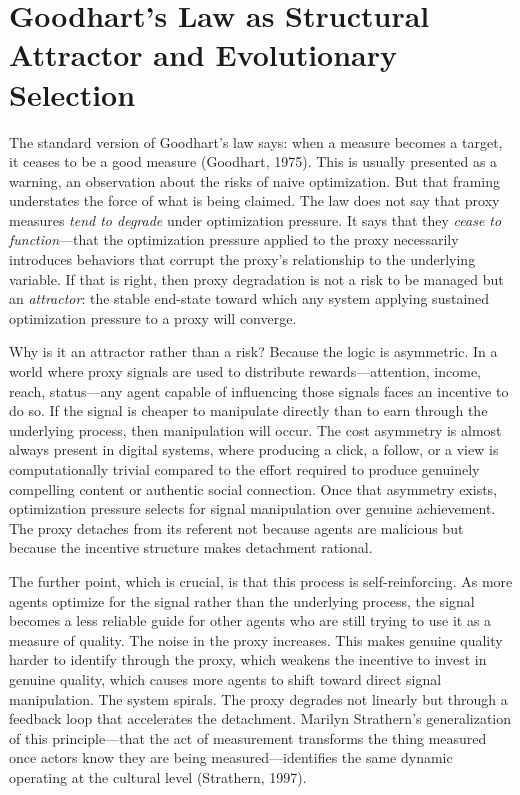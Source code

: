 \documentclass[12pt, a4paper]{article}
\begin{document}
\section{Goodhart's Law as Structural Attractor and Evolutionary Selection}

The standard version of Goodhart's law says: when a measure becomes a target, it ceases to be a good measure (Goodhart, 1975). This is usually presented as a warning, an observation about the risks of naive optimization. But that framing understates the force of what is being claimed. The law does not say that proxy measures \textit{tend to degrade} under optimization pressure. It says that they \textit{cease to function}---that the optimization pressure applied to the proxy necessarily introduces behaviors that corrupt the proxy's relationship to the underlying variable. If that is right, then proxy degradation is not a risk to be managed but an \textit{attractor}: the stable end-state toward which any system applying sustained optimization pressure to a proxy will converge.

Why is it an attractor rather than a risk? Because the logic is asymmetric. In a world where proxy signals are used to distribute rewards---attention, income, reach, status---any agent capable of influencing those signals faces an incentive to do so. If the signal is cheaper to manipulate directly than to earn through the underlying process, then manipulation will occur. The cost asymmetry is almost always present in digital systems, where producing a click, a follow, or a view is computationally trivial compared to the effort required to produce genuinely compelling content or authentic social connection. Once that asymmetry exists, optimization pressure selects for signal manipulation over genuine achievement. The proxy detaches from its referent not because agents are malicious but because the incentive structure makes detachment rational.

The further point, which is crucial, is that this process is self-reinforcing. As more agents optimize for the signal rather than the underlying process, the signal becomes a less reliable guide for other agents who are still trying to use it as a measure of quality. The noise in the proxy increases. This makes genuine quality harder to identify through the proxy, which weakens the incentive to invest in genuine quality, which causes more agents to shift toward direct signal manipulation. The system spirals. The proxy degrades not linearly but through a feedback loop that accelerates the detachment. Marilyn Strathern's generalization of this principle---that the act of measurement transforms the thing measured once actors know they are being measured---identifies the same dynamic operating at the cultural level (Strathern, 1997).
\end{document}
